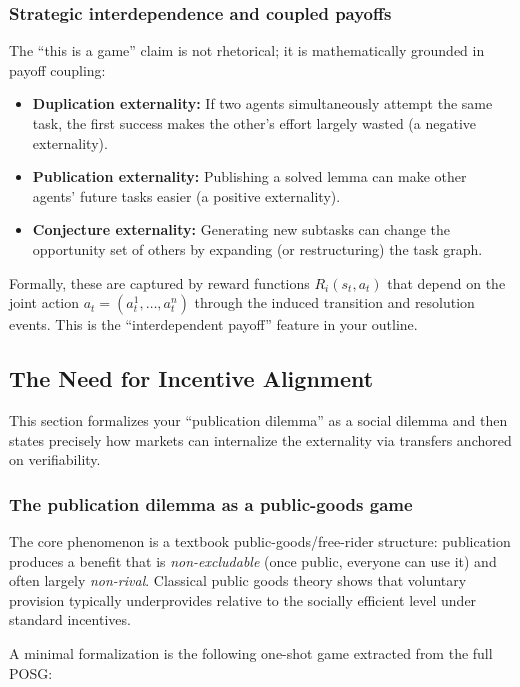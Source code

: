 \subsubsection{Strategic interdependence and coupled payoffs}

The ``this is a game'' claim is not rhetorical; it is mathematically grounded in payoff coupling:

\begin{itemize}
\item \textbf{Duplication externality:} If two agents simultaneously attempt the same task, the first success makes the other's effort largely wasted (a negative externality).
\item \textbf{Publication externality:} Publishing a solved lemma can make other agents' future tasks easier (a positive externality).
\item \textbf{Conjecture externality:} Generating new subtasks can change the opportunity set of others by expanding (or restructuring) the task graph.
\end{itemize}

Formally, these are captured by reward functions \(R_i(s_t, a_t)\) that depend on the joint action \(a_t=(a_t^1,\dots,a_t^n)\) through the induced transition and resolution events. This is the ``interdependent payoff'' feature in your outline.

\subsection{The Need for Incentive Alignment}

This section formalizes your ``publication dilemma'' as a social dilemma and then states precisely how markets can internalize the externality via transfers anchored on verifiability.

\subsubsection{The publication dilemma as a public-goods game}

The core phenomenon is a textbook public-goods/free-rider structure: publication produces a benefit that is \emph{non-excludable} (once public, everyone can use it) and often largely \emph{non-rival}. Classical public goods theory shows that voluntary provision typically underprovides relative to the socially efficient level under standard incentives.

A minimal formalization is the following one-shot game extracted from the full POSG:

